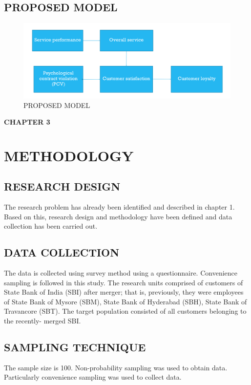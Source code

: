 \documentclass[a4paper, 12pt]{extarticle}
\begin{document}
{\subsection{PROPOSED MODEL}
\begin{figure}[H]
\centering
\includegraphics[scale=0.5]{model.png}
\caption {PROPOSED MODEL}
\end{figure}

\newpage
\begin{center}
\textbf{\large CHAPTER 3}
\end{center}
\section{METHODOLOGY}
\subsection{RESEARCH DESIGN}
The research problem has already been identified and described in chapter 1. Based on this, research design and methodology have been defined and data collection has been carried out.

\subsection{DATA COLLECTION}
\par The data is collected using survey method using a questionnaire. Convenience sampling is followed in this study. The research units comprised of customers of State Bank of India (SBI) after merger; that is, previously, they were employees of State Bank of Mysore (SBM), State Bank of Hyderabad (SBH), State Bank of Travancore (SBT). The target population consisted of all customers belonging to the recently- merged SBI.
\subsection{SAMPLING TECHNIQUE}
The sample size is 100. Non-probability sampling was used to obtain data. Particularly convenience sampling was used to collect data.
}
\end{document}

